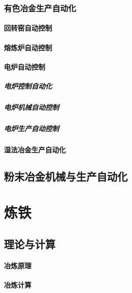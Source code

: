 \documentclass[UTF8]{../../ApplicationUniverse}
\begin{document}
    \subsection{有色冶金生产自动化}
        \subsubsection{回转窑自动控制}
        \subsubsection{熔炼炉自动控制}
        \subsubsection{电炉自动控制}
            \paragraph{电炉控制自动化}
            \paragraph{电炉机械自动控制}
            \paragraph{电炉生产自动控制}
        \subsubsection{湿法冶金生产自动化}
\section{粉末冶金机械与生产自动化}







\chapter{炼铁}
\section{理论与计算}
    \subsubsection{冶炼原理}
    \subsubsection{冶炼计算}
\end{document}
